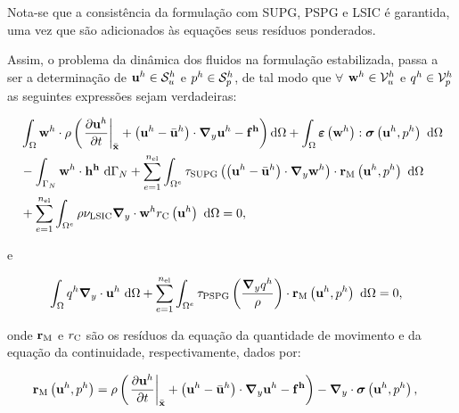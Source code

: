 Nota-se que a consistência da formulação com SUPG, PSPG e LSIC é garantida, uma vez que são adicionados às equações seus resíduos ponderados. 

Assim, o problema da dinâmica dos fluidos na formulação estabilizada, passa a ser a determinação de $\mathbf{u}^h \in \mathcal{S}_u^h$ e $p^h \in \mathcal{S}_p^h$, de tal modo que $\forall$ $\mathbf{w}^h \in \mathcal{V}_u^h$ e $q^h \in \mathcal{V}_p^h$ as seguintes expressões sejam verdadeiras:

\begin{align}
	\begin{split}
		&\int_{\Omega} \mathbf{w}^h \cdot \rho\left(\left. \frac{\partial\mathbf{u}^h}{\partial t}\right|_{\bar{\mathbf{x}}}+ \left(\mathbf{u}^h - \bar{\mathbf{u}}^h \right) \cdot \boldsymbol{\nabla}_y \mathbf{u}^h - \mathbf{f^h}\right) \mathrm{d} \Omega +\int_{\Omega} \bm{\varepsilon} \left(\mathbf{w}^h\right) : \boldsymbol{\sigma} \left(\mathbf{u}^h,p^h\right)\ \mathrm{d} \Omega\\ &
		- \int_{\Gamma_{N}}\mathbf{w}^h \cdot \mathbf{h^h} \ \mathrm{d} \Gamma_{N} 
		+ \sum_{e=1}^{n_{\mathrm{el}}} \int_{\Omega^e} \tau_{\mathrm{SUPG}} \left(\left(\mathbf{u}^h - \bar{\mathbf{u}}^h \right) \cdot \boldsymbol{\nabla}_y \mathbf{w}^h\right) \cdot \mathbf{r}_{\mathrm{M}}\left(\mathbf{u}^h,p^h \right)\  \mathrm{d} \Omega\\
		&+ \sum_{e=1}^{n_{\mathrm{el}}} \int_{\Omega^e} \rho \nu_{\mathrm{LSIC}} \boldsymbol{\nabla}_y \cdot \mathbf{w}^h {r}_{\mathrm{C}}\left(\mathbf{u}^h\right)\  \mathrm{d} \Omega = 0,
		\label{eq:QM_forma_fraca}
	\end{split}
\end{align}

\noindent e

\begin{align}
	\begin{split}
		&\int_{\Omega}q^h \boldsymbol{\nabla}_y \cdot \mathbf{u}^h \ \mathrm{d} \Omega
		+ \sum_{e=1}^{n_{\mathrm{el}}} \int_{\Omega^e} \tau_{\mathrm{PSPG}} \left(\frac{\boldsymbol{\nabla}_y q^h}{\rho}\right) \cdot \mathbf{r}_{\mathrm{M}}\left(\mathbf{u}^h,p^h\right) \  \mathrm{d} \Omega = 0,
		\label{eq:C_forma_fraca}
	\end{split}
\end{align}

\noindent onde $\mathbf{r}_{\mathrm{M}}$ e ${r}_{\mathrm{C}}$ são os resíduos da equação da quantidade de movimento e da equação da continuidade, respectivamente, dados por:

\begin{align}
	\mathbf{r}_{\mathrm{M}}\left(\mathbf{u}^h,p^h\right)&=\rho\left(\left. \frac{\partial\mathbf{u}^h}{\partial t}\right|_{\bar{\mathbf{x}}}+\left(\mathbf{u}^h - \bar{\mathbf{u}}^h \right)\cdot \boldsymbol{\nabla}_y \mathbf{u}^h - \mathbf{f^h}\right) - \boldsymbol{\nabla}_y \cdot \boldsymbol{\sigma}\left(\mathbf{u}^h,p^h\right),
\end{align}

